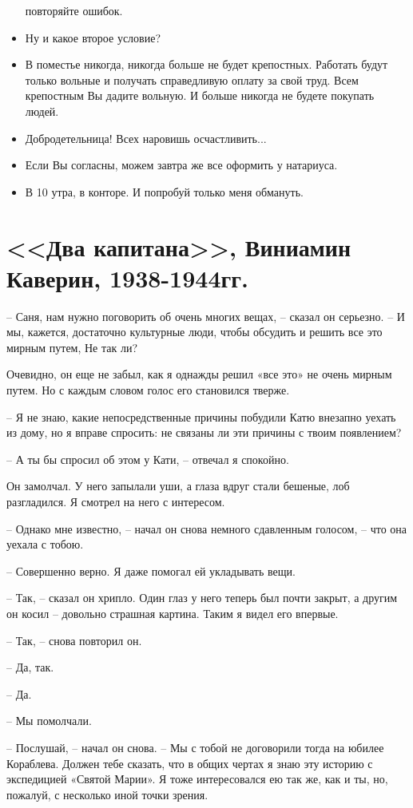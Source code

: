 \documentclass{bmstu}
\begin{document}
\begin{itemize}
        повторяйте ошибок.
    \item Ну и какое второе условие?
    \item В поместье никогда, никогда больше не будет крепостных. Работать
        будут только вольные и получать справедливую оплату за свой труд.
        Всем крепостным Вы дадите вольную. И больше никогда не будете покупать
        людей.
    \item Добродетельница! Всех наровишь осчастливить...
    \item Если Вы согласны, можем завтра же все оформить у натариуса.
    \item В 10 утра, в конторе. И попробуй только меня обмануть.
\end{itemize}

\section*{<<Два капитана>>, Виниамин Каверин, 1938-1944гг.}

– Саня, нам нужно поговорить об очень многих вещах, – сказал он серьезно. – И
мы, кажется, достаточно культурные люди, чтобы обсудить и решить все это мирным
путем, Не так ли?

Очевидно, он еще не забыл, как я однажды решил «все это» не очень мирным путем.
Но с каждым словом голос его становился тверже.

– Я не знаю, какие непосредственные причины побудили Катю внезапно уехать из
дому, но я вправе спросить: не связаны ли эти причины с твоим появлением?

– А ты бы спросил об этом у Кати, – отвечал я спокойно.

Он замолчал. У него запылали уши, а глаза вдруг стали бешеные, лоб разгладился.
Я смотрел на него с интересом.

– Однако мне известно, – начал он снова немного сдавленным голосом, – что она
уехала с тобою.

– Совершенно верно. Я даже помогал ей укладывать вещи.

– Так, – сказал он хрипло. Один глаз у него теперь был почти закрыт, а другим он
косил – довольно страшная картина. Таким я видел его впервые.

– Так, – снова повторил он.

– Да, так.

– Да.

– Мы помолчали.

– Послушай, – начал он снова. – Мы с тобой не договорили тогда на юбилее
Кораблева. Должен тебе сказать, что в общих чертах я знаю эту историю с
экспедицией «Святой Марии». Я тоже интересовался ею так же, как и ты, но,
пожалуй, с несколько иной точки зрения.
\end{document}
